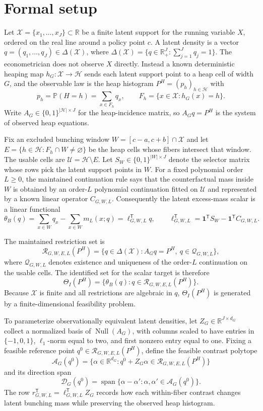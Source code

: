 \documentclass[11pt]{article}
\renewcommand{\Pr}{\mathbb{P}}
\newcommand{\one}{\mathbf{1}}
\newcommand{\transpose}{\mathsf{T}}
\theoremstyle{definition}
\theoremstyle{plain}
\theoremstyle{remark}
\begin{document}
\section{Formal setup}
Let \(\mathcal{X}=\{x_1,\ldots,x_J\}\subset\mathbb{R}\) be a finite latent support for the running variable \(X\), ordered on the real line around a policy point \(c\).  A latent density is a vector \(q=(q_1,\ldots,q_J)\in\Delta(\mathcal{X})\), where \(\Delta(\mathcal{X})=\{q\in\mathbb{R}^J_+: \sum_{j=1}^J q_j=1\}\).  The econometrician does not observe \(X\) directly.  Instead a known deterministic heaping map \(h_G:\mathcal{X}\to\mathcal{H}\) sends each latent support point to a heap cell of width \(G\), and the observable law is the heap histogram \(P^H=(p_h)_{h\in\mathcal{H}}\) with
\[
p_h=\Pr(H=h)=\sum_{x\in F_h} q_x,
\qquad
F_h=\{x\in\mathcal{X}:h_G(x)=h\}.
\]
Write \(A_G\in\{0,1\}^{|\mathcal{H}|\times J}\) for the heap-incidence matrix, so \(A_G q=P^H\) is the system of observed heap equations.

Fix an excluded bunching window \(W=[c-a,c+b]\cap\mathcal{X}\) and let \(E=\{h\in\mathcal{H}:F_h\cap W\neq\varnothing\}\) be the heap cells whose fibers intersect that window.  The usable cells are \(\mathcal{U}=\mathcal{H}\setminus E\).  Let \(S_W\in\{0,1\}^{|W|\times J}\) denote the selector matrix whose rows pick the latent support points in \(W\).  For a fixed polynomial order \(L\ge 0\), the maintained continuation rule says that the counterfactual mass inside \(W\) is obtained by an order-\(L\) polynomial continuation fitted on \(\mathcal{U}\) and represented by a known linear operator \(C_{G,W,L}\).  Consequently the latent excess-mass scalar is a linear functional
\[
\theta_B(q)=\sum_{x\in W} q_x-\sum_{x\in W} m_L(x;q)=\ell_{G,W,L}^{\transpose}q,
\qquad
\ell_{G,W,L}^{\transpose}=\one^{\transpose}S_W-\one^{\transpose}C_{G,W,L}.
\]

The maintained restriction set is
\[
\mathcal{R}_{G,W,E,L}(P^H)
=
\{q\in\Delta(\mathcal{X}):A_Gq=P^H,\ q\in\mathcal{Q}_{G,W,L}\},
\]
where \(\mathcal{Q}_{G,W,L}\) denotes existence and uniqueness of the order-\(L\) continuation on the usable cells.  The identified set for the scalar target is therefore
\[
\Theta_I(P^H)=\{\theta_B(q): q\in\mathcal{R}_{G,W,E,L}(P^H)\}.
\]
Because \(\mathcal{X}\) is finite and all restrictions are algebraic in \(q\), \(\Theta_I(P^H)\) is generated by a finite-dimensional feasibility problem.

To parameterize observationally equivalent latent densities, let \(Z_G\in\mathbb{R}^{J\times d_G}\) collect a normalized basis of \(\operatorname{Null}(A_G)\), with columns scaled to have entries in \(\{-1,0,1\}\), \(\ell_1\)-norm equal to two, and first nonzero entry equal to one.  Fixing a feasible reference point \(q^0\in\mathcal{R}_{G,W,E,L}(P^H)\), define the feasible contrast polytope
\[
\mathcal{A}_G(q^0)=\{\alpha\in\mathbb{R}^{d_G}: q^0+Z_G\alpha\in\mathcal{R}_{G,W,E,L}(P^H)\}
\]
and its direction span
\[
\mathcal{D}_G(q^0)=\operatorname{span}\{\alpha-\alpha':\alpha,\alpha'\in\mathcal{A}_G(q^0)\}.
\]
The row \(r_{G,W,L}^{\transpose}=\ell_{G,W,L}^{\transpose}Z_G\) records how each within-fiber contrast changes latent bunching mass while preserving the observed heap histogram.
\end{document}

